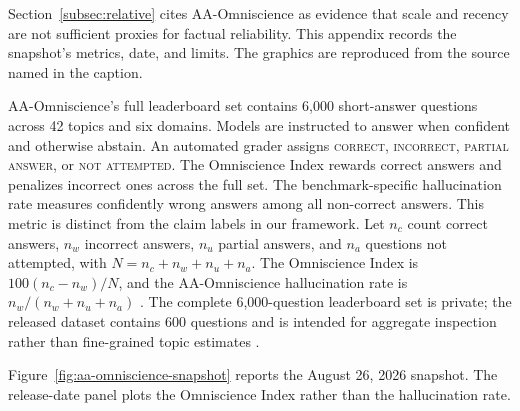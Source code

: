 \documentclass{clv2025}
\begin{document}
%
\makeatletter\def\@currentlabel{B}\makeatother\label{app:omniscience}

Section~\ref{subsec:relative} cites AA-Omniscience as evidence that scale and
recency are not sufficient proxies for factual reliability.
This appendix records the snapshot's metrics, date, and limits. The graphics
are reproduced from the source named in the caption.

AA-Omniscience's full leaderboard set contains 6,000 short-answer questions
across 42 topics and six domains.
Models are instructed to answer when confident and otherwise abstain. An
automated grader assigns \textsc{correct}, \textsc{incorrect},
\textsc{partial answer}, or \textsc{not attempted}. The Omniscience Index
rewards correct answers and penalizes incorrect ones across the full set. The
benchmark-specific hallucination rate measures confidently wrong answers among
all non-correct answers. This metric is distinct from the claim labels in
our framework. Let $n_c$ count correct answers, $n_w$ incorrect answers,
$n_u$ partial answers, and $n_a$ questions not attempted, with
$N=n_{c}+n_{w}+n_{u}+n_{a}$. The Omniscience Index is
$100(n_{c}-n_{w})/N$, and the AA-Omniscience hallucination rate is
$n_{w}/(n_{w}+n_{u}+n_{a})$ \citep{jackson_aaomniscience_2025}.
The complete 6,000-question leaderboard set is private; the released dataset
contains 600 questions and is intended for aggregate inspection rather than
fine-grained topic estimates
\citep{artificialanalysis_aaomniscience_public_2025}.

Figure~\ref{fig:aa-omniscience-snapshot} reports the August 26, 2026 snapshot.
The release-date panel plots the Omniscience Index rather than the
hallucination rate.
\end{document}
